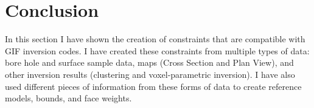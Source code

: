 \section{Conclusion}
\label{sec:GIFtoolsConc}

In this section I have shown the creation of constraints that are compatible with \ac{GIF} inversion codes. I have created these constraints from multiple types of data: bore hole and surface sample data, maps (Cross Section and Plan View), and other inversion results (clustering and voxel-parametric inversion). I have also  used different pieces of information from these forms of data to create reference models, bounds, and face weights.



%

\endinput

Any text after an \endinput is ignored.
You could put scraps here or things in progress.

